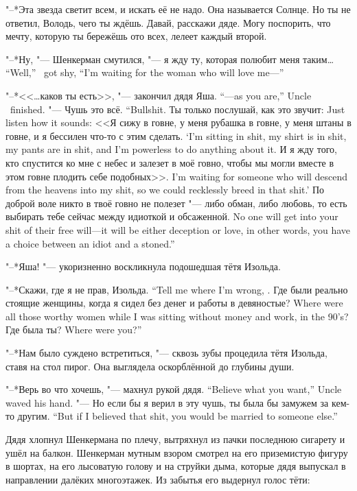 "--*Эта звезда светит всем, и искать её не надо.
Она называется Солнце.
Но ты не ответил, Володь, чего ты ждёшь.
Давай, расскажи дяде.
Могу поспорить, что мечту, которую ты бережёшь ото всех, лелеет каждый второй.

{"--*Ну, "--- Шенкерман смутился, "--- я жду ту, которая полюбит меня таким\ldots{}}
{``Well,'' \Shenkerman\ got shy, ``I'm waiting for the woman who will love me---''}

{"--*<<\ldots{}каков ты есть>>, "--- закончил дядя Яша.}
{``---as you are,'' Uncle \Yasha\ finished.}
{"--- Чушь это всё.}
{``Bullshit.}
{Ты только послушай, как это звучит:}
{Just listen how it sounds:}
{<<Я сижу в говне, у меня рубашка в говне, у меня штаны в говне, и я бессилен что-то с этим сделать.}
{`I'm sitting in shit, my shirt is in shit, my pants are in shit, and I'm powerless to do anything about it.}
{И я жду того, кто спустится ко мне с небес и залезет в моё говно, чтобы мы могли вместе в этом говне плодить себе подобных>>.}
{I'm waiting for someone who will descend from the heavens into my shit, so we could recklessly breed in that shit.'}
{По доброй воле никто в твоё говно не полезет "--- либо обман, либо любовь, то есть выбирать тебе сейчас между идиоткой и обсаженной.}
{No one will get into your shit of their free will---it will be either deception or love, in other words, you have a choice between an idiot and a stoned.''}

"--*Яша! "--- укоризненно воскликнула подошедшая тётя Изольда.

{"--*Скажи, где я не прав, Изольда.}
{``Tell me where I'm wrong, \Izolda.}
{Где были реально стоящие женщины, когда я сидел без денег и работы в девяностые?}
{Where were all those worthy women while I was sitting without money and work, in the 90's?}
{Где была ты?}
{Where were you?''}

"--*Нам было суждено встретиться, "--- сквозь зубы процедила тётя Изольда, ставя на стол пирог.
Она выглядела оскорблённой до глубины души.

{"--*Верь во что хочешь, "--- махнул рукой дядя.}
{``Believe what you want,'' Uncle waved his hand.}
{"--- Но если бы я верил в эту чушь, ты была бы замужем за кем-то другим.}
{``But if I believed that shit, you would be married to someone else.''}

Дядя хлопнул Шенкермана по плечу, вытряхнул из пачки последнюю сигарету и ушёл на балкон.
Шенкерман мутным взором смотрел на его приземистую фигуру в шортах, на его лысоватую голову и на струйки дыма, которые дядя выпускал в направлении далёких многоэтажек.
Из забытья его выдернул голос тёти:

